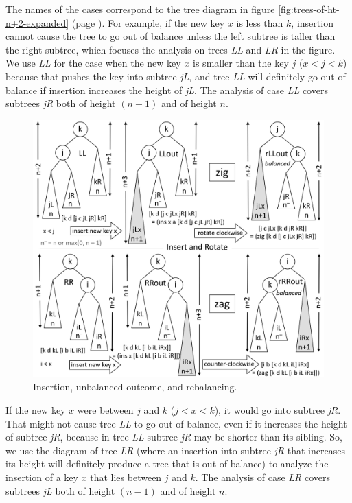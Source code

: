 The names of the cases correspond
to the tree diagram in
figure \ref{fig:trees-of-ht-n+2-expanded} (page \pageref{fig:trees-of-ht-n+2-expanded}).
For example, if the new key $x$ is less than $k$,
insertion cannot cause the tree to go out of
balance unless the left subtree is taller
than the right subtree, which focuses the
analysis on trees \emph{LL} and \emph{LR}
in the figure.
We use \emph{LL} for the case when the new key $x$
is smaller than the key $j$
($x < j < k$)
because that pushes the key into subtree \emph{jL},
and tree \emph{LL} will definitely go out of balance
if insertion increases the height of \emph{jL}.
The analysis of case \emph{LL} covers
subtrees \emph{jR} both of height $(n-1)$ and of height $n$.

\begin{figure}
\begin{center}
\includegraphics[scale=1]{images-cmyk/zig-and-zag}
\end{center}
\caption{Insertion, unbalanced outcome, and rebalancing.}
\label{fig:zig-and-zag}
\end{figure}

If the new key $x$ were between $j$ and $k$ ($j < x < k$),
it would go into subtree \emph{jR}.
That might not cause tree \emph{LL} to go out of balance,
even if it increases the height of
subtree \emph{jR}, because in tree \emph{LL}
subtree \emph{jR} may be shorter than its sibling.
So, we use the diagram of tree \emph{LR}
(where an insertion into subtree \emph{jR}
that increases its height will definitely
produce a tree that is out of balance)
to analyze the insertion of a
key $x$ that lies between $j$ and $k$.
The analysis of case \emph{LR} covers
subtrees \emph{jL} both of height $(n-1)$ and of height $n$.

